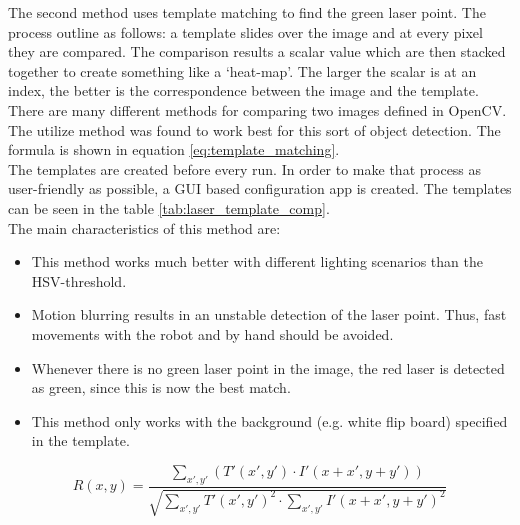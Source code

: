 \documentclass[./\jobname.tex]{subfiles}
\begin{document}
The second method uses template matching to find the green laser point. The process outline as follows: a template slides over the image and at every pixel they are compared. The comparison results a scalar value which are then stacked together to create something like a `heat-map'. The larger the scalar is at an index, the better is the correspondence between the image and the template. \\
There are many different methods for comparing two images defined in OpenCV. The utilize method was found to work best for this sort of object detection. The formula is shown in equation \ref{eq:template_matching}. \\
The templates are created before every run. In order to make that process as user-friendly as possible, a GUI based configuration app is created. The templates can be seen in the table \ref{tab:laser_template_comp}. \\
The main characteristics of this method are: 
\begin{itemize}
	\item This method works much better with different lighting scenarios than the HSV-threshold.
	\item Motion blurring results in an unstable detection of the laser point. Thus, fast movements with the robot and by hand should be avoided. 
	\item Whenever there is no green laser point in the image, the red laser is detected as green, since this is now the best match. 
	\item This method only works with the background (e.g. white flip board) specified in the template. 
\end{itemize} 

\begin{equation}
R(x,y) = \frac{\sum_{x',y'} (T'(x',y') \cdot I'(x + x', y + y'))}{\sqrt{\sum_{x',y'} T'(x',y')^{2} \cdot \sum_{x',y'} I'(x + x', y + y')^{2}}}
\label{eq:template_matching}
\end{equation}
\end{document}

